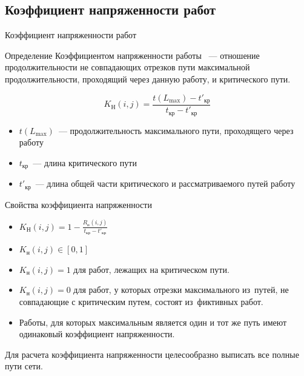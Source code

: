 \documentclass[unicode,11pt,notheorems]{beamer}
\begin{document}
\subsection{Коэффициент напряженности работ}
\begin{frame}{Коэффициент напряженности работ}
%

\begin{block}{Определение}
\alert{Коэффициентом напряженности   работы} ~--- отношение продолжительности не совпадающих отрезков пути максимальной продолжительности, проходящий через данную работу, и критического пути.
\end{block}
$$
K_\text{Н}(i,j)= \frac{t(L_{\max})-t'_\text{кр}}{t_\text{кр}-t'_\text{кр}}
$$

\begin{itemize}
\item $t(L_{\max})$~--- продолжительность максимального пути, проходящего через работу
\item $t_\text{кр}$~--- длина критического пути
\item $t'_\text{кр}$~--- длина общей части критического и рассматриваемого путей
 работу\end{itemize}


\end{frame}

\begin{frame}{Свойства коэффициента напряженности}

\begin{itemize}
\item 
	$K_\text{Н}(i,j)= 1-\frac{R_\text{п}(i,j) }{t_\text{кр}-t'_\text{кр}}$

\item 
	$K_\text{н}(i,j) \in [0,1]$
\item 
	$K_\text{н}(i,j) = 1$ для работ, лежащих на критическом пути.
\item 
	$K_\text{н}(i,j) = 0$ для работ, у которых отрезки максимального из~путей, не совпадающие с критическим путем, состоят из~фиктивных работ.
\item 
	Работы, для которых максимальным является один и тот же путь имеют одинаковый коэффициент напряженности.
\end{itemize}
\begin{block}{}
Для расчета коэффициента напряженности  целесообразно выписать все полные пути сети.
\end{block}
\end{frame}
\end{document}
